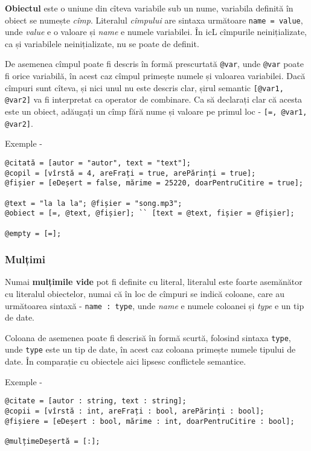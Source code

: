 {\bf Obiectul} este o uniune din cîteva variabile sub un nume, variabila definită în obiect se numește {\it cîmp}. Literalul {\it cîmpului} are sintaxa următoare \texttt{name = value}, unde  {\it value} e o valoare și {\it name} e numele variabilei. În icL cîmpurile neinițializate, ca și variabilele neinițializate, nu se poate de definit.

De asemenea cîmpul poate fi descris în formă prescurtată \texttt{@var}, unde \texttt{@var} poate fi orice variabilă, în acest caz cîmpul primește numele și valoarea variabilei. Dacă cîmpuri sunt cîteva, și nici unul nu este descris clar, șirul semantic \texttt{[@var1, @var2]} va fi interpretat ca operator de combinare. Ca să declarați clar că acesta este un obiect, adăugați un cîmp fără nume și valoare pe primul loc - \texttt{[=, @var1, @var2]}.

\noindent Exemple -
\begin{verbatim}
@citată = [autor = "autor", text = "text"];
@copil = [vîrstă = 4, areFrați = true, arePărinți = true];
@fișier = [eDeșert = false, mărime = 25220, doarPentruCitire = true];

@text = "la la la"; @fișier = "song.mp3";
@obiect = [=, @text, @fișier]; `` [text = @text, fișier = @fișier];

@empty = [=];
\end{verbatim}

\subsubsection{Mulțimi}

Numai {\bf mulțimile vide} pot fi definite cu literal, literalul este foarte asemănător cu literalul obiectelor, numai că în loc de cîmpuri se indică coloane, care au următoarea sintaxă - \texttt{name : type}, unde  {\it name} e numele coloanei și {\it type} e un tip de date.

Coloana de asemenea poate fi descrisă în formă scurtă, folosind sintaxa \texttt{type}, unde \texttt{type} este un tip de date, în acest caz coloana primește numele tipului de date. În comparație cu obiectele aici lipsesc conflictele semantice.

\noindent Exemple -
\begin{verbatim}
@citate = [autor : string, text : string];
@copii = [vîrstă : int, areFrați : bool, arePărinți : bool];
@fișiere = [eDeșert : bool, mărime : int, doarPentruCitire : bool];

@mulțimeDeșertă = [:];
\end{verbatim}


